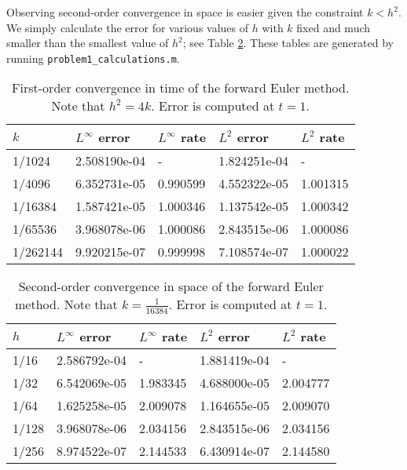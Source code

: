 \documentclass{homework}
\begin{document}
\begin{alphaparts}
		Observing second-order convergence in space is easier given the constraint $k < h^2$. We simply calculate the error for various values of $h$ with $k$ fixed and much smaller than the smallest value of $h^2$; see Table \ref{table:euler_space}. These tables are generated by running \verb*|problem1_calculations.m|.
		
		\begin{table}[h]
			\centering
			\begin{tabular}{@{}lllll@{}}
				\toprule
				$k$ & $L^\infty$ error & $L^\infty$ rate & $L^2$ error & $L^2$ rate \\
				\midrule
				1/1024&	2.508190e-04&	-	&1.824251e-04&	-\\
				1/4096&	6.352731e-05&	0.990599&	4.552322e-05&	1.001315\\
				1/16384&	1.587421e-05&	1.000346&	1.137542e-05&	1.000342\\
				1/65536	&3.968078e-06&	1.000086	&2.843515e-06&	1.000086\\
				1/262144&	9.920215e-07&	0.999998&	7.108574e-07&	1.000022\\
				\bottomrule
			\end{tabular}
			\caption{First-order convergence in time of the forward Euler method. Note that $h^2 = 4k$. Error is computed at $t =1$.}
			\label{table:euler_time}
		\end{table}
		
		\begin{table}[h]
			\centering
			\begin{tabular}{@{}lllll@{}}
				\toprule
				$h$ & $L^\infty$ error & $L^\infty$ rate & $L^2$ error & $L^2$ rate \\
				\midrule
				1/16&	2.586792e-04&	-	&1.881419e-04&	- \\
				1/32&	6.542069e-05&	1.983345&	4.688000e-05&	2.004777 \\
				1/64&	1.625258e-05&	2.009078&	1.164655e-05&	2.009070 \\
				1/128&	3.968078e-06&	2.034156&	2.843515e-06&	2.034156 \\
				1/256&	8.974522e-07&	2.144533&	6.430914e-07&	2.144580\\
				\bottomrule
			\end{tabular}
			\caption{Second-order convergence in space of the forward Euler method. Note that $k = \frac{1}{16384}$. Error is computed at $t =1$.}
			\label{table:euler_space}
		\end{table}
		
	\end{alphaparts}
	
\end{document}
